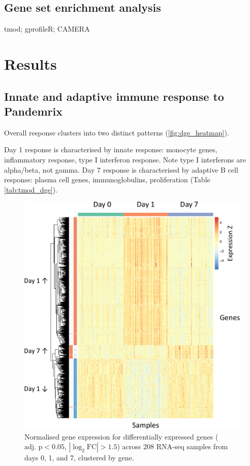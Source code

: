 \subsection{Gene set enrichment analysis}

tmod; gprofileR; CAMERA

\section{Results}

\subsection{Innate and adaptive immune response to Pandemrix}

Overall response clusters into two distinct patterns (\autoref{fig:dge_heatmap}).

Day 1 response is characterised by innate response: monocyte genes, inflammatory response, type I interferon response.
Note type I interferons are alpha/beta, not gamma.
Day 7 response is characterised by adaptive B cell response: plasma cell genes, immunoglobulins, proliferation (Table \ref{tab:tmod_dge}).

\begin{figure}
    \includegraphics[width=1.0\textwidth]{mainmatter/figures/chapter_02/graphics_ashg19/plot_dge_eqtl.heatmap_dge.annotated-crop.pdf}
    \caption{Normalised gene expression for differentially expressed genes ($\text{adj. p} < 0.05$, $\left|\log_2\text{FC}\right| > 1.5$) across 208 RNA-seq samples from days 0, 1, and 7, clustered by gene.}
    \label{fig:dge_heatmap}
\end{figure}

